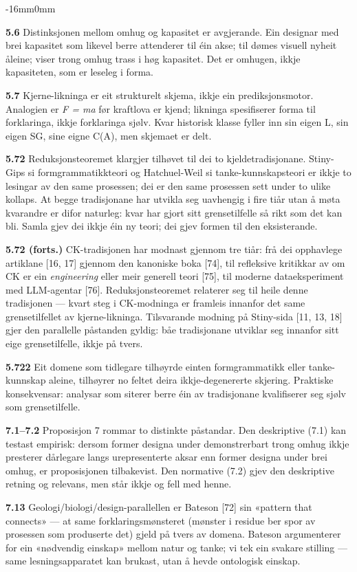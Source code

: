 \documentclass[10pt,oneside]{book}
\newcommand{\msym}[1]{{\mathfbfont #1}}
\newenvironment{widebody}{%
  \begin{adjustwidth}{-16mm}{0mm}%
}{%
  \end{adjustwidth}%
}
\begin{document}
\begin{widebody}
{\textbf{5.6} Distinksjonen mellom omhug og kapasitet er avgjerande. Ein designar med brei kapasitet som likevel berre attenderer til éin akse; til dømes visuell nyheit åleine; viser trong omhug trass i høg kapasitet. Det er omhugen, ikkje kapasiteten, som er leseleg i forma.

\textbf{5.7} Kjerne-likninga er eit strukturelt skjema, ikkje ein prediksjonsmotor. Analogien er \textit{F = ma} før kraftlova er kjend; likninga spesifiserer forma til forklaringa, ikkje forklaringa sjølv. Kvar historisk klasse fyller inn sin eigen \msym{L}, sin eigen SG, sine eigne C(A), men skjemaet er delt.

\textbf{5.72} Reduksjonsteoremet klargjer tilhøvet til dei to kjeldetradisjonane. Stiny-Gips si formgrammatikkteori og Hatchuel-Weil si tanke-kunnskapsteori er ikkje to lesingar av den same prosessen; dei er den same prosessen sett under to ulike kollaps. At begge tradisjonane har utvikla seg uavhengig i fire tiår utan å møta kvarandre er difor naturleg: kvar har gjort sitt grensetilfelle så rikt som det kan bli. Samla gjev dei ikkje éin ny teori; dei gjev formen til den eksisterande.

\textbf{5.72 (forts.)} CK-tradisjonen har modnast gjennom tre tiår: frå dei opphavlege artiklane [16, 17] gjennom den kanoniske boka [74], til refleksive kritikkar av om CK er ein \textit{engineering} eller meir generell teori [75], til moderne dataeksperiment med LLM-agentar [76]. Reduksjonsteoremet relaterer seg til heile denne tradisjonen — kvart steg i CK-modninga er framleis innanfor det same grensetilfellet av kjerne-likninga. Tilsvarande modning på Stiny-sida [11, 13, 18] gjer den parallelle påstanden gyldig: båe tradisjonane utviklar seg innanfor sitt eige grensetilfelle, ikkje på tvers.

\textbf{5.722} Eit domene som tidlegare tilhøyrde einten formgrammatikk eller tanke-kunnskap aleine, tilhøyrer no feltet deira ikkje-degenererte skjering. Praktiske konsekvensar: analysar som siterer berre éin av tradisjonane kvalifiserer seg sjølv som grensetilfelle.

\textbf{7.1--7.2} Proposisjon 7 rommar to distinkte påstandar. Den deskriptive (7.1) kan testast empirisk: dersom former designa under demonstrerbart trong omhug ikkje presterer dårlegare langs urepresenterte aksar enn former designa under brei omhug, er proposisjonen tilbakevist. Den normative (7.2) gjev den deskriptive retning og relevans, men står ikkje og fell med henne.

\textbf{7.13} Geologi/biologi/design-parallellen er Bateson [72] sin «pattern that connects» — at same forklaringsmønsteret (mønster i residue ber spor av prosessen som produserte det) gjeld på tvers av domena. Bateson argumenterer for ein «nødvendig einskap» mellom natur og tanke; vi tek ein svakare stilling — same lesningsapparatet kan brukast, utan å hevde ontologisk einskap.

}
\end{widebody}
\end{document}
